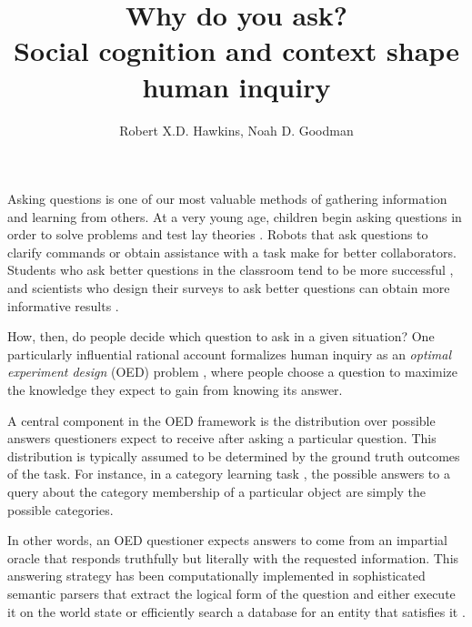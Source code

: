 \documentclass[11pt, floatsintext]{apa6}
\title{Why do you ask? \\ Social cognition and context shape human inquiry}
\author{Robert X.D. Hawkins, Noah D. Goodman}
\affiliation{Stanford University}
\begin{document}
\maketitle
Asking questions is one of our most valuable methods of gathering information and learning from others. 
At a very young age, children begin asking questions in order to solve problems and test lay theories \cite{LegareEtAl13_QuestionsChildhood, Chouinard07_ChildrenQuestions,CallananOakes92_PreschoolerQuestions}. 
Robots that ask questions to clarify commands \cite{DeitsTellex___Roy13_HumanRobotDialog} or obtain assistance with a task \cite{FongThorpeBaur03_RobotQuestions} make for better collaborators. 
Students who ask better questions in the classroom tend to be more successful \cite{GraesserPerson94_QuestionAskingTutoring}, and scientists who design their surveys to ask better questions can obtain more informative results \cite{ClarkSchober92_InfluencingAnswers}.

How, then, do people decide which question to ask in a given situation?
One particularly influential rational account formalizes human inquiry as an \emph{optimal experiment design} (OED) problem \cite{OaksfordChater94_RationalAnalysisSelectionTask,Nelson05_UsefulQuestions,MyungPitt09_OED, GureckisMarkant12_SelfDirectedLearning,coenen2018asking}, where people choose a question to maximize the knowledge they expect to gain from knowing its answer. 

A central component in the OED framework is the distribution over possible answers questioners expect to receive after asking a particular question.
This distribution is typically assumed to be determined by the ground truth outcomes of the task. 
For instance, in a category learning task \cite{MarkantGureckis14_ActiveLearning}, the possible answers to a query about the category membership of a particular object are simply the possible categories.

In other words, an OED questioner expects answers to come from an impartial oracle that responds truthfully but literally with the requested information.
This answering strategy has been computationally implemented in sophisticated semantic parsers that extract the logical form of the question and either execute it on the world state \cite{rothe2017question} or efficiently search a database for an entity that satisfies it \cite{BerantChouFrostigLiang13_FreebaseQAPairs}. 
\end{document}
